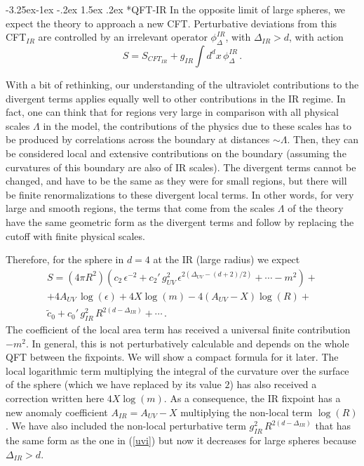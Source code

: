 \documentclass[11pt]{article}
\makeatletter
\renewcommand\subsubsection{\@startsection{subsubsection}{3}{\z@}%
                                   {-3.25ex\@plus -1ex \@minus -.2ex}%
                                     {1.5ex \@plus .2ex}%
                                     {\normalfont\itshape}}
\numberwithin{equation}{section}
\newcommand{\be}{\begin{equation}}
\newcommand{\ee}{\end{equation}}
\makeatother
\begin{document}
\subsubsection*{QFT-IR}
In the opposite limit of large spheres, we expect the theory to approach a new CFT. Perturbative deviations from this CFT$_{IR}$ are controlled by an irrelevant operator $\phi_\Delta^{IR}$, with $\Delta_{IR}> d$, with action
\be
S=S_{CFT_{IR}}+g_{IR} \int d^dx\, \phi^{IR}_\Delta\,. 
\ee

With a bit of rethinking, our understanding of the ultraviolet contributions to the divergent terms applies equally well to other contributions in the IR regime. In fact, one can think that for regions very large in comparison with all physical scales $\Lambda$ in the model,  the contributions of the physics due to these scales has to be produced by correlations across the boundary at distances $\sim\Lambda$. Then, they can be considered local and extensive contributions on the boundary (assuming the curvatures of this boundary are also of IR scales). The divergent terms cannot be changed, and have to be the same as they were for small regions, but there will be finite renormalizations to these divergent local terms. In other words, for very large and smooth regions, the terms that come from the scales $\Lambda$ of the theory have the same geometric form as the divergent terms and follow by replacing the cutoff with finite physical scales.  

Therefore, for the sphere in $d=4$ at the IR (large radius) we expect  
\begin{multline}
S=(4 \pi R^2)\left(c_2 \,\epsilon^{-2}+ c_{2}'\,g_{UV}^2 \,\epsilon^{2 \left(\Delta_{UV} -(d+2)/2\right)}+\cdots -m^2 \right) +
\\
+ 4 A_{UV} \, \log(\epsilon)+4 X \log(m) -4 (A_{UV}-X) \log(R) + \\
\tilde{c}_0 +c_0'\, g_{IR}^2 \, R^{2(d-\Delta_{IR})}+\cdots\,.
\end{multline}
The coefficient of the local area term has received a universal finite contribution $-m^2$. In general, this is not perturbatively calculable and depends on the whole QFT between the fixpoints. We will show a compact formula for it later. The local logarithmic term multiplying the integral of the curvature over the surface of the sphere (which we have replaced by its value $2$) has also received a correction written here $4 X \log(m)$. As a consequence, the IR fixpoint has a new anomaly coefficient $A_{IR}=A_{UV}-X$ multiplying the non-local term $\log(R)$. We have also included the non-local perturbative term $g_{IR}^2 \, R^{2(d-\Delta_{IR})}$ that has the same form as the one in (\ref{uvi}) but now it decreases for large spheres because $\Delta_{IR}>d$.     
\end{document}
